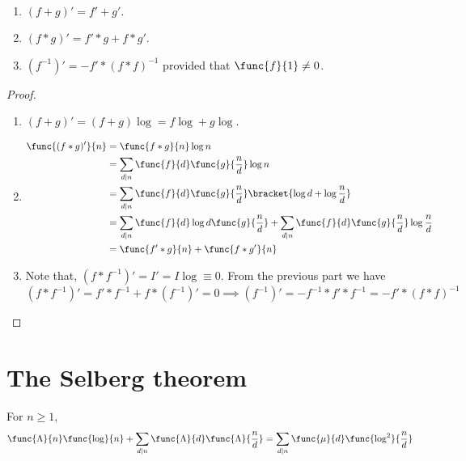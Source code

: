 \begin{theorem}
    \ 
    \begin{enumerate}
        \item \((f + g)' = f' + g'\).
        \item \((f \ast g)' = f' \ast g + f \ast g'\).
        \item \((f^{-1})' = -f' \ast (f \ast f)^{-1}\) provided that \(\func{f}{1} \neq 0\). 
    \end{enumerate}
\end{theorem}

\begin{proof}
    \ 
    \begin{enumerate}
        \item \((f + g)' = (f + g)\log = f \log + g \log \).
        \item 
        \begin{align*}
            \func{(f \ast g)'}{n} &= \func{f \ast g}{n} \log n\\
            &= \sum_{d \mid n} \func{f}{d} \func{g}{\frac{n}{d}} \log n\\
            &= \sum_{d \mid n} \func{f}{d} \func{g}{\frac{n}{d}} \bracket{\log d + \log \frac{n}{d}} \\
            &= \sum_{d \mid n} \func{f}{d}\log d \func{g}{\frac{n}{d}}+ \sum_{d \mid n} \func{f}{d} \func{g}{\frac{n}{d}} \log \frac{n}{d}\\
            &= \func{f' \ast g}{n} + \func{f \ast g'}{n}
        \end{align*}
        \item Note that, \((f \ast f^{-1})' = I' = I \log \equiv 0\). From the previous part we have 
        \begin{equation*}
            (f \ast f^{-1})' = f' \ast f^{-1} + f \ast (f^{-1})' = 0 \implies (f^{-1})' = - f^{-1} \ast f' \ast f^{-1} = -f' \ast (f \ast f)^{-1}
        \end{equation*}
    \end{enumerate}
\end{proof}

\section{The Selberg theorem}
\begin{theorem}
    For \(n \geq 1\), 
    \begin{equation*}
        \func{\Lambda}{n} \func{\log}{n} + \sum_{d \mid n} \func{\Lambda}{d} \func{\Lambda}{\frac{n}{d}} = \sum_{d \mid n} \func{\mu}{d} \func{\log^2}{\frac{n}{d}}
    \end{equation*}
\end{theorem}

